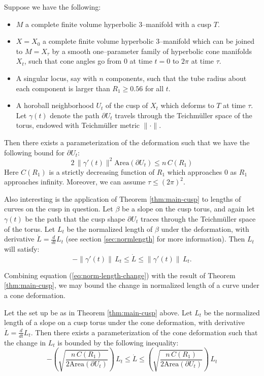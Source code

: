 \begin{theorem}  Suppose we have the following:
  \begin{itemize}
  \item $M$ a complete finite volume hyperbolic 3--manifold with a
    cusp $T$.
  \item $X=X_0$ a complete finite volume hyperbolic 3--manifold which
    can be joined to $M=X_\tau$ by a smooth one--parameter family of
    hyperbolic cone manifolds $X_t$, such that cone angles go from $0$
    at time $t=0$ to $2\pi$ at time $\tau$.
  \item A singular locus, say with $n$ components, such that the tube
    radius about each component is larger than $R_1\geq 0.56$ for all
    $t$.
  \item A horoball neighborhood $U_t$ of the cusp of $X_t$ which
    deforms to $T$ at time $\tau$.  Let $\gamma(t)$ denote the path
    $\partial U_t$ travels through the Teichm{\"u}ller space of the
    torus, endowed with Teichm{\"u}ller metric $\| \cdot \|$.
  \end{itemize}
	Then there exists a parameterization of the deformation such that
  we have the following bound for $\partial U_t$:
  $$2\,\|\gamma'(t)\|^2 \mbox{Area}(\partial U_t) \leq n\,C(R_1)$$
  Here $C(R_1)$ is a strictly decreasing function of $R_1$ which
  approaches $0$ as $R_1$ approaches infinity.
  Moreover, we can assume $\tau \leq (2\pi)^2$.
\label{thm:main-cusp}
\end{theorem}


Also interesting is the application of Theorem \ref{thm:main-cusp}
to lengths of curves on the cusp in question.  Let $\beta$ be a slope
on the cusp torus, and again let $\gamma(t)$ be the path that the cusp
shape $\partial U_t$ traces through the {T}eichm{\"u}ller space of the
torus.  Let $L_t$ be the normalized length of $\beta$ under the
deformation, with derivative $\dot{L} = \frac{d}{dt}L_t$ (see
section \ref{sec:normlength} for more information).  Then $L_t$ will
satisfy:
\begin{equation}
  -\|\gamma'(t)\|\, L_t \leq \dot{L} \leq
   \|\gamma'(t)\|\, L_t.
  \label{eq:norm-length-change}
\end{equation}

Combining equation (\ref{eq:norm-length-change}) with the result of
Theorem \ref{thm:main-cusp}, we may bound the change in normalized
length of a curve under a cone deformation.

\begin{theorem}
Let the set up be as in Theorem \ref{thm:main-cusp} above.  Let $L_t$
be the normalized length of a slope on a cusp torus under the cone
deformation, with derivative $\dot{L} = \frac{d}{dt}L_t$.  Then
there exists a parameterization of the cone deformation such that
the change in $L_t$ is bounded by the following inequality:
$$ -\left(\sqrt{\frac{n\,C(R_1)}{2\mbox{Area}(\partial U_t)}}\right)
\, L_t \leq \dot{L} \leq
\left(\sqrt{\frac{n\,C(R_1)}{2\mbox{Area}(\partial U_t)}}\right) \,
L_t
$$
\label{thm:main-norm-length}
\end{theorem}

